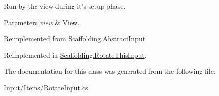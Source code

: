 Run by the view during it's setup phase. 


\begin{DoxyParams}{Parameters}
{\em view} & View.\\
\hline
\end{DoxyParams}


Reimplemented from \hyperlink{class_scaffolding_1_1_abstract_input_a598859c6342920d2b0c985310e6e9476}{Scaffolding.\-Abstract\-Input}.



Reimplemented in \hyperlink{class_scaffolding_1_1_rotate_this_input_a9e0fc73644310f1efd1f49e692638c89}{Scaffolding.\-Rotate\-This\-Input}.



The documentation for this class was generated from the following file\-:\begin{DoxyCompactItemize}
\item 
Input/\-Items/Rotate\-Input.\-cs\end{DoxyCompactItemize}
